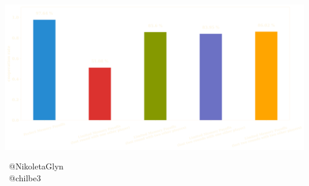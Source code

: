 \documentclass{beamer}
\begin{document}
\begin{frame}
    \centering
    \includegraphics[width=\textwidth]{static/results_five.png}
\end{frame}

\begin{frame}
    \begin{center}
    \faTwitter \ @NikoletaGlyn \\
    \faTwitter \ @chilbe3 \\
    \end{center}
\end{frame}
\end{document}

